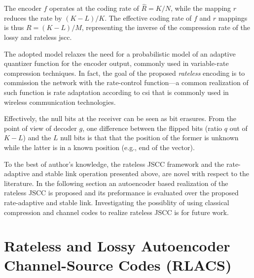 The encoder $f$ operates at the coding rate of $\hat{R} = K/N$, while the mapping $r$ reduces the rate by $(K-L)/K$.
The effective coding rate of $f$ and $r$ mappings is thus $R = (K-L)/M$,   representing the inverse of the compression rate of the lossy and rateless \gls{jscc}. 




The adopted model relaxes the need for a probabilistic model of an adaptive quantizer function for the encoder output, commonly used in variable-rate compression techniques. In fact, the goal of the proposed \emph{rateless} encoding is to commission the network with the rate-control function---a common realization of such function is rate adaptation according to \gls{csi} that is commonly used in wireless communication technologies. 

\begin{remark}
    Effectively, the null bits at the receiver can be seen as bit erasures. From the point of view of decoder $g$, one difference between the flipped bits (ratio $q$ out of $K-L$) and the $L$ null bits is that that the position of the former is unknown while the latter is in a known position (e.g., end of the vector). 
\end{remark}


To the best of author's knowledge, the  rateless JSCC framework and the rate-adaptive and stable link operation presented above, are novel with respect to the literature. In the following section an autoencoder based realization of the rateless JSCC is proposed and its preformance is evaluated over the proposed rate-adaptive and stable link. Investigating the possiblity of using classical compression and channel codes to realize rateless JSCC is for future work.




\section{Rateless and Lossy Autoencoder Channel-Source Codes (RLACS)}
\label{sec:relax}

